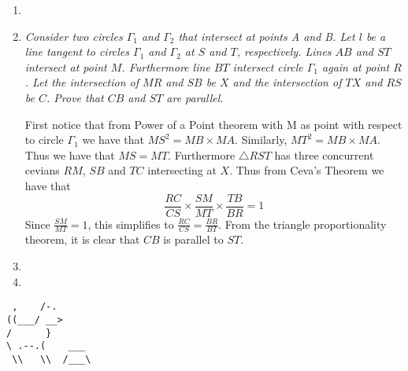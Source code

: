 \documentclass{article}
\begin{document}
\begin{enumerate}[1.]
\vspace{12pt}
\item %



\vspace{6pt}
\item %
\textit{Consider two circles $\Gamma_1$ and $\Gamma_2$ that intersect at points A and B. Let $l$ be a line tangent to circles $\Gamma_1$ and $\Gamma_2$ at $S$ and $T$, respectively. Lines $AB$ and $ST$ intersect at point $M$. Furthermore line $BT$ intersect circle $\Gamma_1$ again at point $R$. Let the intersection of $MR$ and $SB$ be $X$ and the intersection of $TX$ and $RS$ be $C$. 
Prove that $CB$ and $ST$ are parallel.}

First notice that from Power of a Point theorem with M as point with respect to circle $\Gamma_1$ we have that $MS^2 = MB \times MA$. Similarly, $MT^2 = MB \times MA$. Thus we have that $MS = MT$. Furthermore $\triangle RST$ has three concurrent cevians $RM$, $SB$ and $TC$ intersecting at $X$. Thus from Ceva's Theorem we have that $$\frac{RC}{CS} \times \frac{SM}{MT} \times \frac{TB}{BR} = 1$$
Since $\frac{SM}{MT} = 1$, this simplifies to $\frac{RC}{CS} = \frac{BR}{BT}$. From the triangle proportionality theorem, it is clear that $CB$ is parallel to $ST$.

\vspace{6pt}
\item %




\vspace{6pt}
\item %





\end{enumerate}


\vfill
\centering
\begin{BVerbatim}
 ,    /-.
((___/ __>
/      }
\ .--.(    ___
 \\   \\  /___\
\end{BVerbatim}
\end{document}
